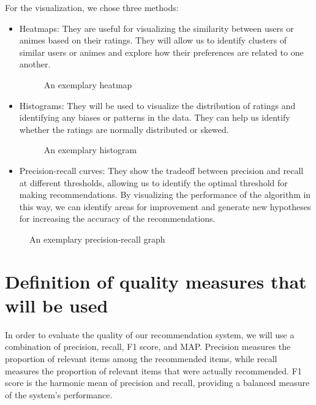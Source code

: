 \documentclass[12pt]{article}
\begin{document}
For the visualization, we chose three methods:
\begin{itemize}
\item Heatmaps: They are useful for visualizing the similarity between users or animes based on their ratings. They will allow us to identify clusters of similar users or animes and explore how their preferences are related to one another.

\begin{figure}
\centering
    \caption{An exemplary heatmap}
    \label{fig:heatmap}
\end{figure}

\item Histograms: They will be used to visualize the distribution of ratings and identifying any biases or patterns in the data. They can help us identify whether the ratings are normally distributed or skewed.

\begin{figure}
\centering
    \caption{An exemplary histogram}
    \label{fig:precission-recall}
\end{figure}

\item Precision-recall curves: They show the tradeoff between precision and recall at different thresholds, allowing us to identify the optimal threshold for making recommendations. By visualizing the performance of the algorithm in this way, we can identify areas for improvement and generate new hypotheses for increasing the accuracy of the recommendations.
\end{itemize}

\begin{figure}
\centering
    \caption{An exemplary precision-recall graph}
    \label{fig:histogram}
\end{figure}

\section{Definition of quality measures that will be used}
In order to evaluate the quality of our recommendation system, we will use a combination of precision, recall, F1 score, and MAP. Precision measures the proportion of relevant items among the recommended items, while recall measures the proportion of relevant items that were actually recommended. F1 score is the harmonic mean of precision and recall, providing a balanced measure of the system's performance.
\end{document}
